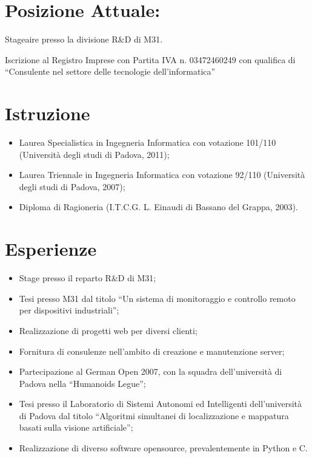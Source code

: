 \documentclass[pdftex, a4paper, 11pt]{article}
\begin{document}
\section*{Posizione Attuale:}

Stageaire presso la divisione R\&D di M31.

Iscrizione al Registro Imprese con Partita IVA n. 03472460249 con qualifica di ``Consulente nel settore delle tecnologie dell'informatica''


\section*{Istruzione}
\begin{itemize}
\item Laurea Specialistica in Ingegneria Informatica con votazione 101/110 (Universit\`a degli studi di Padova, 2011);
\item Laurea Triennale in Ingegneria Informatica con votazione 92/110 (Universit\`a degli
  studi di Padova, 2007);
\item Diploma di Ragioneria (I.T.C.G. L. Einaudi di Bassano del Grappa,
  2003).
\end{itemize}

\section*{Esperienze}
\begin{itemize}
\item Stage presso il reparto R\&D di M31;
\item Tesi presso M31 dal titolo ``Un sistema di monitoraggio e controllo remoto per dispositivi industriali'';
\item Realizzazione di progetti web per diversi clienti;
\item Fornitura di consulenze nell'ambito di creazione e manutenzione server;
\item Partecipazione al German Open 2007, con la squadra
  dell'universit\`a di Padova nella ``Humanoids Legue'';
\item Tesi presso il Laboratorio di Sistemi Autonomi ed
  Intelligenti dell'universit\`a di Padova dal titolo ``Algoritmi
  simultanei di localizzazione e mappatura basati sulla visione artificiale'';
\item Realizzazione di diverso software opensource,
  prevalentemente in Python e C.
\end{itemize}
\end{document}
